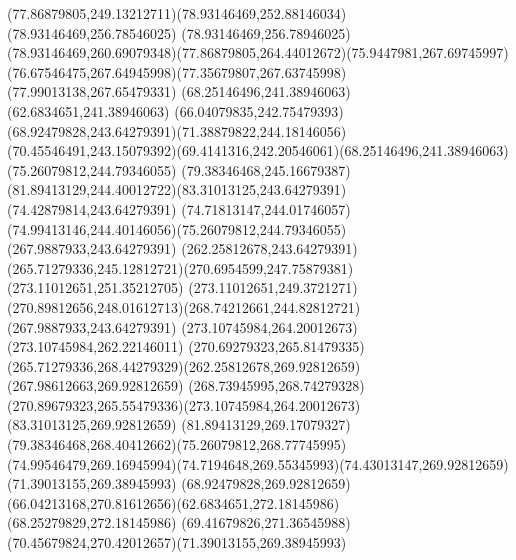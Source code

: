 {{\curveto(77.86879805,249.13212711)(78.93146469,252.88146034)(78.93146469,256.78546025)
\lineto(78.93146469,256.78946025)
\curveto(78.93146469,260.69079348)(77.86879805,264.44012672)(75.9447981,267.69745997)
\curveto(76.67546475,267.64945998)(77.35679807,267.63745998)(77.99013138,267.65479331)
\moveto(68.25146496,241.38946063)
\lineto(62.6834651,241.38946063)
\curveto(66.04079835,242.75479393)(68.92479828,243.64279391)(71.38879822,244.18146056)
\curveto(70.45546491,243.15079392)(69.4141316,242.20546061)(68.25146496,241.38946063)
\moveto(75.26079812,244.79346055)
\curveto(79.38346468,245.16679387)(81.89413129,244.40012722)(83.31013125,243.64279391)
\lineto(74.42879814,243.64279391)
\curveto(74.71813147,244.01746057)(74.99413146,244.40146056)(75.26079812,244.79346055)
\moveto(267.9887933,243.64279391)
\lineto(262.25812678,243.64279391)
\curveto(265.71279336,245.12812721)(270.6954599,247.75879381)(273.11012651,251.35212705)
\lineto(273.11012651,249.3721271)
\curveto(270.89812656,248.01612713)(268.74212661,244.82812721)(267.9887933,243.64279391)
\moveto(273.10745984,264.20012673)
\lineto(273.10745984,262.22146011)
\curveto(270.69279323,265.81479335)(265.71279336,268.44279329)(262.25812678,269.92812659)
\lineto(267.98612663,269.92812659)
\curveto(268.73945995,268.74279328)(270.89679323,265.55479336)(273.10745984,264.20012673)
\moveto(83.31013125,269.92812659)
\curveto(81.89413129,269.17079327)(79.38346468,268.40412662)(75.26079812,268.77745995)
\curveto(74.99546479,269.16945994)(74.7194648,269.55345993)(74.43013147,269.92812659)
\closepath
\moveto(71.39013155,269.38945993)
\curveto(68.92479828,269.92812659)(66.04213168,270.81612656)(62.6834651,272.18145986)
\lineto(68.25279829,272.18145986)
\curveto(69.41679826,271.36545988)(70.45679824,270.42012657)(71.39013155,269.38945993)
}
}
